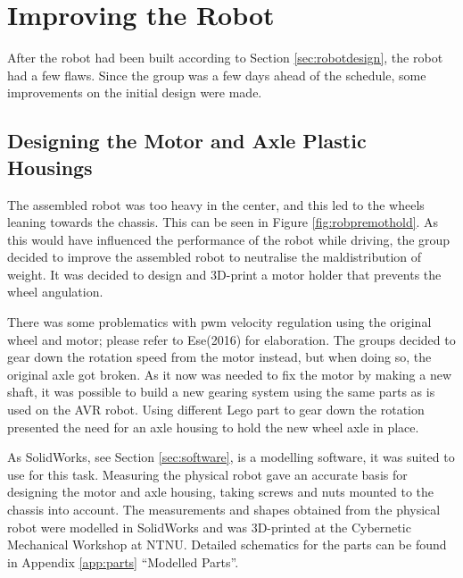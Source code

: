 \section{Improving the Robot}
\label{sec:improvements}
After the robot had been built according to Section \ref{sec:robotdesign}, the robot had a few flaws. Since the group was a few days ahead of the schedule, some improvements on the initial design were made.

\subsection{Designing the Motor and Axle Plastic Housings}
\label{sec:motoraxle}
The assembled robot was too heavy in the center, and this led to the wheels leaning towards the chassis. This can be seen in Figure \ref{fig:robpremothold}.  As this would have influenced the performance of the robot while driving, the group decided to improve the assembled robot to neutralise the maldistribution of weight. It was decided to design and 3D-print a motor holder that prevents the wheel angulation.

There was some problematics with \acrshort{pwm} velocity regulation using the original wheel and motor; please refer to Ese(2016) for elaboration. The groups decided to gear down the rotation speed from the motor instead, but when doing so, the original axle got broken. As it now was needed to fix the motor by making a new shaft, it was possible to build a new gearing system using the same parts as is used on the AVR robot. Using different Lego part to gear down the rotation presented the need for an axle housing to hold the new wheel axle in place.

As SolidWorks, see Section \ref{sec:software}, is a modelling software, it was suited to use for this task. Measuring the physical robot gave an accurate basis for designing the motor and axle housing, taking screws and nuts mounted to the chassis into account. The measurements and shapes obtained from the physical robot were modelled in SolidWorks and was 3D-printed at the Cybernetic Mechanical Workshop at NTNU. Detailed schematics for the parts can be found in Appendix \ref{app:parts} ``Modelled Parts''. 


